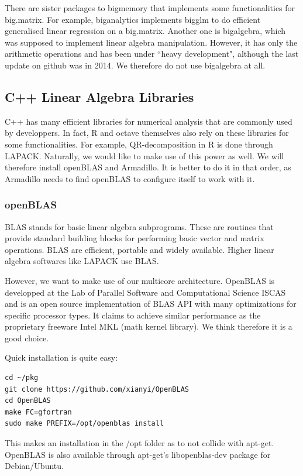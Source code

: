 \documentclass[a4paper,11pt]{amsart}
\begin{document}
There are sister packages to bigmemory that implements some functionalities for big.matrix. For example, biganalytics implements bigglm to do efficient generalised linear regression on a big.matrix. Another one is bigalgebra, which was supposed to implement linear algebra manipulation. However, it has only the arithmetic operations and has been under ``heavy development", although the last update on github was in 2014. We therefore do not use bigalgebra at all. 

\subsection{C++ Linear Algebra Libraries}
C++ has many efficient libraries for numerical analysis that are commonly used by developpers. In fact, R and octave themselves also rely on these libraries for some functionalities. For example, QR-decomposition in R is done through LAPACK. Naturally, we would like to make use of this power as well. We will therefore install openBLAS and Armadillo. It is better to do it in that order, as Armadillo needs to find openBLAS to configure itself to work with it.

\subsubsection{openBLAS} 
BLAS stands for basic linear algebra subprograms. These are routines that provide standard building blocks for performing basic vector and matrix operations. BLAS are efficient, portable and widely available. Higher linear algebra softwares like LAPACK use BLAS. 

However, we want to make use of our multicore architecture. OpenBLAS is developped at the Lab of Parallel Software and Computational Science ISCAS and is an open source implementation of BLAS API with many optimizations for specific processor types. It claims to achieve similar performance as the proprietary freeware Intel MKL (math kernel library). We think therefore it is a good choice.

Quick installation is quite easy:
\begin{verbatim}
cd ~/pkg
git clone https://github.com/xianyi/OpenBLAS
cd OpenBLAS
make FC=gfortran
sudo make PREFIX=/opt/openblas install
\end{verbatim}
This makes an installation in the /opt folder as to not collide with apt-get. OpenBLAS is also available through apt-get's libopenblas-dev package for Debian/Ubuntu. 
\end{document}

